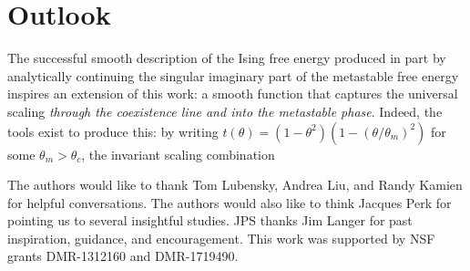 \documentclass[
  aps,
  pre,
  preprint,
  longbibliography,
  floatfix
]{revtex4-2}
\begin{document}
\section{Outlook}

The successful smooth description of the Ising free energy produced in part by analytically continuing the singular imaginary part of the metastable free energy inspires an extension of this work: a smooth function that captures the universal scaling \emph{through the coexistence line and into the metastable phase}. Indeed, the tools exist to produce this: by writing $t(\theta)=(1-\theta^2)(1-(\theta/\theta_m)^2)$ for some $\theta_m>\theta_c$, the invariant scaling combination

\begin{acknowledgments}
  The authors would like to thank Tom Lubensky, Andrea Liu, and Randy Kamien
  for helpful conversations. The authors would also like to think Jacques Perk
  for pointing us to several insightful studies. JPS thanks Jim Langer for past
  inspiration, guidance, and encouragement. This work was supported by NSF
  grants DMR-1312160 and DMR-1719490.
\end{acknowledgments}


\end{document}

